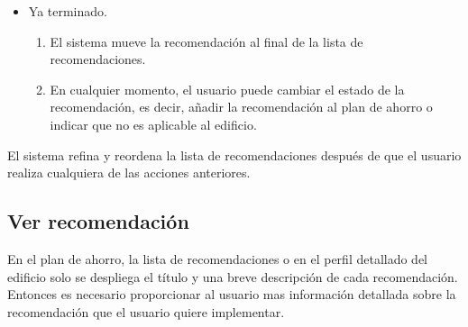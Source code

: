 \begin{usecase}
{\begin{itemize}
\begin{enumerate}
      \end{enumerate}
    \item Ya terminado.
      \begin{enumerate}
      \item El sistema mueve la recomendación al final de la lista de
        recomendaciones.
      \item En cualquier momento, el usuario puede cambiar el estado de la
        recomendación, es decir, añadir la recomendación al plan de ahorro
        o indicar que no es aplicable al edificio.
      \end{enumerate}
    \end{itemize}
  \item El sistema refina y reordena la lista de recomendaciones después de que
    el usuario realiza cualquiera de las acciones anteriores.
  }
\end{usecase}

\subsection{Ver recomendación}

En el plan de ahorro, la lista de recomendaciones o en el perfil detallado
del edificio solo se despliega el título y una breve descripción de cada
recomendación. Entonces es necesario proporcionar al usuario mas información
detallada sobre la recomendación que el usuario quiere implementar.

